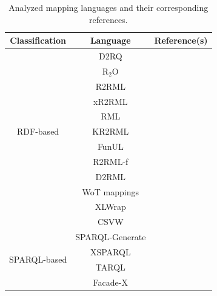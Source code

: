 \begin{table}[t]
\caption[Mapping languages overview]{Analyzed mapping languages and their corresponding references. }
\label{tab:chp2_languages_summary}
\begin{tabular}{c|c|c}
\hline
Classification                 & Language        & Reference(s) \\ \hline
\multirow{11}{*}{RDF-based}   & D2RQ            & \citep{bizer2004d2rq,d2rq}\\ \cline{2-3} 
                              & R$_2$O          & \citep{barrasa2004r2o}\\ \cline{2-3} 
                              & R2RML           & \citep{das2012r2rml}\\ \cline{2-3} 
                              & xR2RML          & \citep{michel2015xr2rml,xr2rml}\\ \cline{2-3} 
                              & RML             & \citep{Dimou2014rml,rml}\\ \cline{2-3} 
                              & KR2RML          & \citep{slepicka2015kr2rml}\\ \cline{2-3} 
                              & FunUL           & \citep{junior2016funul}\\ \cline{2-3} 
                              & R2RML-f         & \citep{debruyne2016r2rmlf}\\ \cline{2-3} 
                              & D2RML           & \citep{chortaras2018d2rml}\\ \cline{2-3}  
                              & WoT mappings    & \citep{cimmino2020ewot}\\ \cline{2-3} 
                              & XLWrap          & \citep{langegger2009xlwrap,xlwrap}\\ \cline{2-3} 
                              & CSVW            & \citep{Tennison2015csvw}\\ \hline
\multirow{4}{*}{SPARQL-based} & SPARQL-Generate &     
                              \citep{Lefrancois2017sparqlgenerate,sparqlgenerate}\\ \cline{2-3} 
                              & XSPARQL         & \citep{Bischof2012xsparql,xsparql}\\ \cline{2-3} 
                              & TARQL           & \citep{tarql}\\ \cline{2-3}
                              & Facade-X        & \citep{asprino2023sparql-anything,sparqlanything}\\ \cline{2-3}

\end{tabular}
\end{table}
